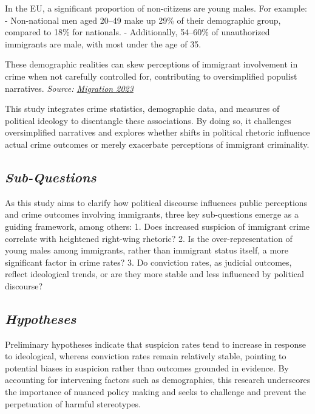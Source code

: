 \documentclass[
]{article}
\begin{document}
In the EU, a significant proportion of non-citizens are young males. For
example: - Non-national men aged 20--49 make up 29\% of their
demographic group, compared to 18\% for nationals. - Additionally,
54--60\% of unauthorized immigrants are male, with most under the age of
35.

These demographic realities can skew perceptions of immigrant
involvement in crime when not carefully controlled for, contributing to
oversimplified populist narratives. \emph{Source:
\href{https://ec.europa.eu/eurostat/web/interactive-publications/migration-2023}{Migration
2023}}

This study integrates crime statistics, demographic data, and measures
of political ideology to disentangle these associations. By doing so, it
challenges oversimplified narratives and explores whether shifts in
political rhetoric influence actual crime outcomes or merely exacerbate
perceptions of immigrant criminality.

\subsection{\texorpdfstring{\emph{Sub-Questions}}{Sub-Questions}}\label{sub-questions}

As this study aims to clarify how political discourse influences public
perceptions and crime outcomes involving immigrants, three key
sub-questions emerge as a guiding framework, among others: 1. Does
increased suspicion of immigrant crime correlate with heightened
right-wing rhetoric? 2. Is the over-representation of young males among
immigrants, rather than immigrant status itself, a more significant
factor in crime rates? 3. Do conviction rates, as judicial outcomes,
reflect ideological trends, or are they more stable and less influenced
by political discourse?

\subsection{\texorpdfstring{\emph{Hypotheses}}{Hypotheses}}\label{hypotheses}

Preliminary hypotheses indicate that suspicion rates tend to increase in
response to ideological, whereas conviction rates remain relatively
stable, pointing to potential biases in suspicion rather than outcomes
grounded in evidence. By accounting for intervening factors such as
demographics, this research underscores the importance of nuanced policy
making and seeks to challenge and prevent the perpetuation of harmful
stereotypes.
\end{document}
